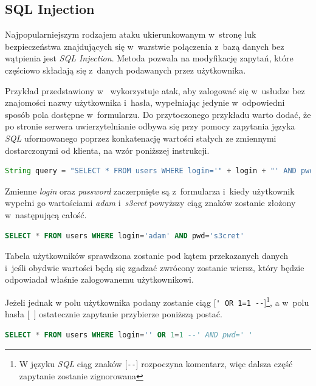 \documentclass[11pt]{aghdpl}
\begin{document}

\subsection{SQL Injection}

Najpopularniejszym rodzajem ataku ukierunkowanym w~stronę luk bezpieczeństwa znajdujących się w~warstwie połączenia z~bazą danych bez wątpienia jest \emph{SQL Injection}. Metoda pozwala na modyfikację zapytań, które częściowo składają się z~danych podawanych przez użytkownika.

Przykład przedstawiony w~\cite{PSqlI} wykorzystuje atak, aby zalogować się w~usłudze bez znajomości nazwy użytkownika i~hasła, wypełniając jedynie w~odpowiedni sposób pola dostępne w~formularzu. Do przytoczonego przykładu warto dodać, że po stronie serwera uwierzytelnianie odbywa się przy pomocy zapytania języka \emph{SQL} uformowanego poprzez konkatenację wartości stałych ze zmiennymi dostarczonymi od klienta, na wzór poniższej instrukcji.

\begin{lstlisting}[language=Java]
String query = "SELECT * FROM users WHERE login='" + login + "' AND pwd='" + password + "'";
\end{lstlisting}

Zmienne \emph{login} oraz \emph{password} zaczerpnięte są z~formularza i~kiedy użytkownik wypełni go wartościami \emph{adam} i~\emph{s3cret} powyższy ciąg znaków zostanie złożony w~następującą całość.

\begin{lstlisting}[language=SQL]
SELECT * FROM users WHERE login='adam' AND pwd='s3cret'
\end{lstlisting}

Tabela użytkowników sprawdzona zostanie pod kątem przekazanych danych i~jeśli obydwie wartości będą się zgadzać zwrócony zostanie wiersz, który będzie odpowiadał właśnie zalogowanemu użytkownikowi.

Jeżeli jednak w polu użytkownika podany zostanie ciąg [\lstinline$' OR 1=1 --$]\footnote{W języku \emph{SQL} ciąg znaków [\lstinline$--$] rozpoczyna komentarz, więc dalsza część zapytanie zostanie zignorowana}, a w~polu hasła [\lstinline$ $] ostatecznie zapytanie przybierze poniższą postać.

\begin{lstlisting}[language=SQL]
SELECT * FROM users WHERE login='' OR 1=1 --' AND pwd=' '
\end{lstlisting}
\end{document}
